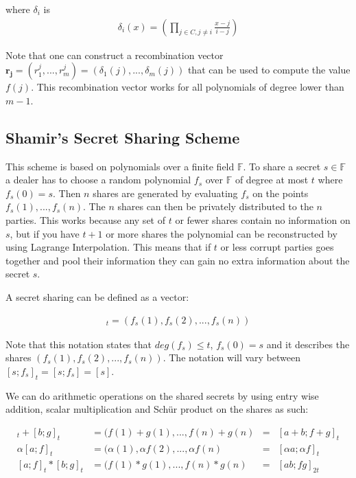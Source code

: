 \noindent where $\delta_i$ is
\begin{align*}
    \delta_i(x)=(\prod_{j \in C, j \neq i} \frac{x-j}{i-j})
\end{align*}

Note that one can construct a recombination vector $\boldsymbol{r_j}=(r_1^j,...,r_m^j)=(\delta_1(j),...,\delta_m(j))$ that can be used to compute the value $f(j)$. This recombination vector works for all polynomials of degree lower than $m-1$.

\subsection{Shamir's Secret Sharing Scheme}
This scheme is based on polynomials over a finite field $\mathbb{F}$. To share a secret $s \in \mathbb{F}$ a dealer has to choose a random polynomial $f_s$ over $\mathbb{F}$ of degree at most $t$ where $f_s(0)=s$. Then $n$ shares are generated by evaluating $f_s$ on the points $f_s(1),...,f_s(n)$. The $n$ shares can then be privately distributed to the $n$ parties. This works because any set of $t$ or fewer shares contain no information on $s$, but if you have $t+1$ or more shares the polynomial can be reconstructed by using Lagrange Interpolation. This means that if $t$ or less corrupt parties goes together and pool their information they can gain no extra information about the secret $s$. 

A secret sharing can be defined as a vector:

\begin{align*}
    [s;f_s]_t = (f_s(1), f_s(2), ..., f_s(n))
\end{align*}

Note that this notation states that $deg(f_s) \leq t$, $f_s(0)=s$ and it describes the shares $(f_s(1), f_s(2), ..., f_s(n))$. The notation will vary between $[s;f_s]_t=[s;f_s]=[s]$. 

We can do arithmetic operations on the shared secrets by using entry wise addition, scalar multiplication and Schür product on the shares as such:

\begin{align*}
    [a;f]_t + [b;g]_t &= (f(1) + g(1), ... , f(n) + g(n)  &=& [a+b; f+g]_t\\
    \alpha [a;f]_t &= (\alpha(1), \alpha f(2), ... , \alpha f(n) &=& [\alpha a; \alpha f]_t\\
    [a;f]_t * [b;g]_t &= (f(1) * g(1), ... , f(n) * g(n) &=& [ab;fg]_{2t}
\end{align*}

